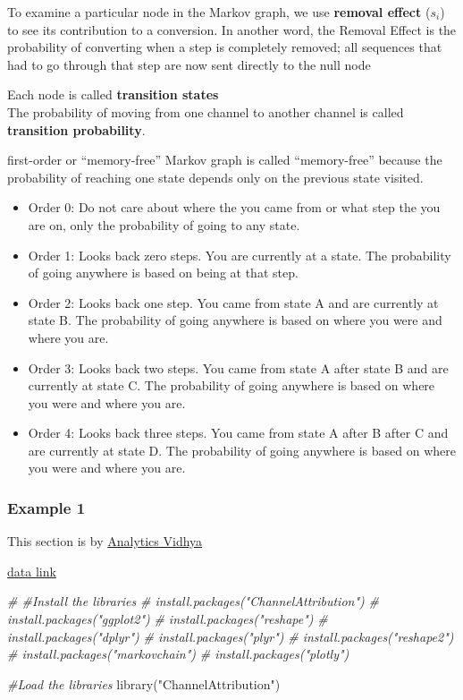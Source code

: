 \documentclass[
]{book}
\newenvironment{Shaded}{\begin{snugshade}}{\end{snugshade}}
\newcommand{\CommentTok}[1]{\textcolor[rgb]{0.56,0.35,0.01}{\textit{#1}}}
\newcommand{\FunctionTok}[1]{\textcolor[rgb]{0.00,0.00,0.00}{#1}}
\newcommand{\NormalTok}[1]{#1}
\newcommand{\StringTok}[1]{\textcolor[rgb]{0.31,0.60,0.02}{#1}}
\providecommand{\tightlist}{%
  \setlength{\itemsep}{0pt}\setlength{\parskip}{0pt}}
\begin{document}
To examine a particular node in the Markov graph, we use \textbf{removal effect} (\(s_i\)) to see its contribution to a conversion. In another word, the Removal Effect is the probability of converting when a step is completely removed; all sequences that had to go through that step are now sent directly to the null node

Each node is called \textbf{transition states}\\
The probability of moving from one channel to another channel is called \textbf{transition probability}.

first-order or ``memory-free'' Markov graph is called ``memory-free'' because the probability of reaching one state depends only on the previous state visited.

\begin{itemize}
\tightlist
\item
  Order 0: Do not care about where the you came from or what step the you are on, only the probability of going to any state.
\item
  Order 1: Looks back zero steps. You are currently at a state. The probability of going anywhere is based on being at that step.
\item
  Order 2: Looks back one step. You came from state A and are currently at state B. The probability of going anywhere is based on where you were and where you are.
\item
  Order 3: Looks back two steps. You came from state A after state B and are currently at state C. The probability of going anywhere is based on where you were and where you are.
\item
  Order 4: Looks back three steps. You came from state A after B after C and are currently at state D. The probability of going anywhere is based on where you were and where you are.
\end{itemize}

\hypertarget{example-1}{%
\subsubsection{Example 1}\label{example-1}}

This section is by \href{https://www.analyticsvidhya.com/blog/2018/01/channel-attribution-modeling-using-markov-chains-in-r/}{Analytics Vidhya}

\href{https://www.dropbox.com/s/wi907ms4h4cl1p0/Channel_attribution.csv?dl=0}{data link}

\begin{Shaded}
\begin{Highlighting}[]
\CommentTok{\# \#Install the libraries}
\CommentTok{\# install.packages("ChannelAttribution")}
\CommentTok{\# install.packages("ggplot2")}
\CommentTok{\# install.packages("reshape")}
\CommentTok{\# install.packages("dplyr")}
\CommentTok{\# install.packages("plyr")}
\CommentTok{\# install.packages("reshape2")}
\CommentTok{\# install.packages("markovchain")}
\CommentTok{\# install.packages("plotly")}

\CommentTok{\#Load the libraries}
\FunctionTok{library}\NormalTok{(}\StringTok{"ChannelAttribution"}\NormalTok{)}
\end{Highlighting}
\end{Shaded}
\end{document}
